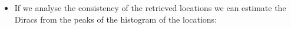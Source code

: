 \documentclass[8pt]{beamer}
\begin{document}
\begin{frame}
\begin{itemize}
{\begin{figure}[h]
\end{figure}
}

\item<8-> If we analyse the consistency of the retrieved locations we can estimate 
the Diracs from the peaks of the histogram of the locations:


\end{itemize}
\end{frame}
\end{document}

